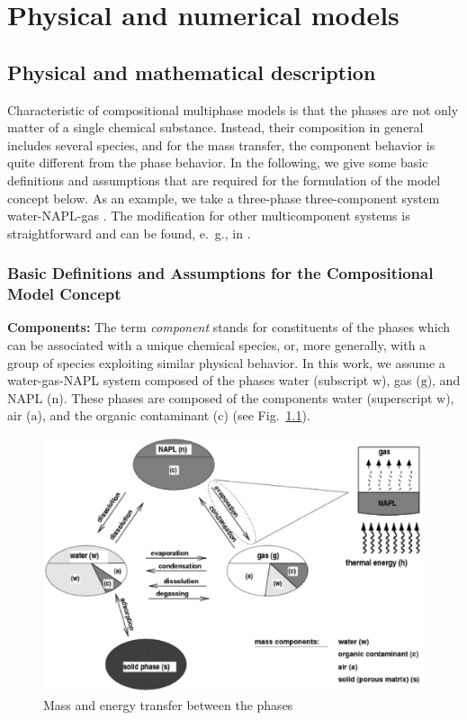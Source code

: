 \chapter[Models]{Physical and numerical models}

\section{Physical and mathematical description} 

Characteristic of compositional multiphase models is that the phases
are not only matter of a single chemical substance. Instead, their
composition in general includes several species, and for the mass transfer, 
the component behavior is quite different from the phase behavior. In the following, we
give some basic definitions and assumptions that are required for the
formulation of the model concept below. As an example, we take a
three-phase three-component system water-NAPL-gas
\cite{A3:class:2002a}. The modification for other multicomponent
systems is straightforward and can be found, e.\ g., in
\cite{A3:bielinski:2006,A3:acosta:2006}.

\subsection{Basic Definitions and Assumptions for the Compositional
  Model Concept}
\textbf{Components:}
The term {\it component} stands for constituents of the phases which
can be associated with a unique chemical species, or, more generally, with 
a group of species exploiting similar physical behavior. In this work, we
assume a water-gas-NAPL system composed of the phases water (subscript
$\text{w}$), gas ($\text{g}$), and NAPL ($\text{n}$). These phases are
composed of the components water (superscript $\text{w}$), air
($\text{a}$), and the organic contaminant ($\text{c}$) (see Fig.\
\ref{A3:fig:mundwtrans}).
%
\begin{figure}[hbt]
  \centering
  \includegraphics[width=0.7\linewidth]{EPS/masstransfer}
  \caption{Mass and energy transfer between the phases}
  \label{A3:fig:mundwtrans}
\end{figure}

